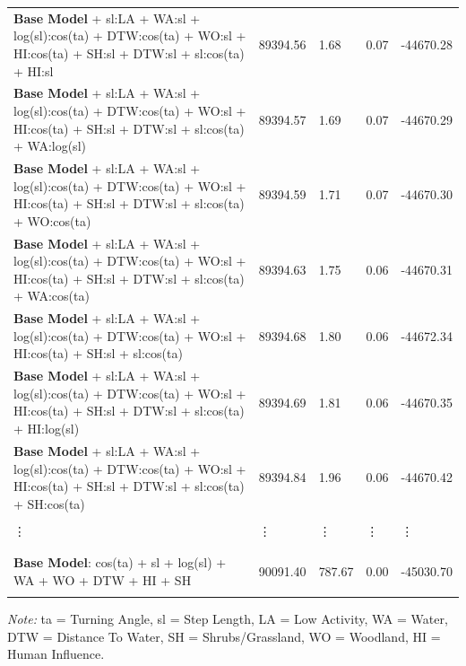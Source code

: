 \documentclass[abstract=off,10pt,a4paper,bibliography=totocnumbered]{article}
\begin{document}
\begin{landscape}
\begin{table}[hbpt]
\begin{center}
{\begin{threeparttable}
\begin{tabular}{lllll}
          \textbf{Base Model} + sl:LA + WA:sl + log(sl):cos(ta) + DTW:cos(ta) + WO:sl + HI:cos(ta) + SH:sl + DTW:sl + sl:cos(ta) + HI:sl & 89394.56 & 1.68 & 0.07 & -44670.28 \\
          \textbf{Base Model} + sl:LA + WA:sl + log(sl):cos(ta) + DTW:cos(ta) + WO:sl + HI:cos(ta) + SH:sl + DTW:sl + sl:cos(ta) + WA:log(sl) & 89394.57 & 1.69 & 0.07 & -44670.29 \\
          \textbf{Base Model} + sl:LA + WA:sl + log(sl):cos(ta) + DTW:cos(ta) + WO:sl + HI:cos(ta) + SH:sl + DTW:sl + sl:cos(ta) + WO:cos(ta) & 89394.59 & 1.71 & 0.07 & -44670.30 \\
          \textbf{Base Model} + sl:LA + WA:sl + log(sl):cos(ta) + DTW:cos(ta) + WO:sl + HI:cos(ta) + SH:sl + DTW:sl + sl:cos(ta) + WA:cos(ta) & 89394.63 & 1.75 & 0.06 & -44670.31 \\
          \textbf{Base Model} + sl:LA + WA:sl + log(sl):cos(ta) + DTW:cos(ta) + WO:sl + HI:cos(ta) + SH:sl + sl:cos(ta) & 89394.68 & 1.80 & 0.06 & -44672.34 \\
          \textbf{Base Model} + sl:LA + WA:sl + log(sl):cos(ta) + DTW:cos(ta) + WO:sl + HI:cos(ta) + SH:sl + DTW:sl + sl:cos(ta) + HI:log(sl) & 89394.69 & 1.81 & 0.06 & -44670.35 \\
          \textbf{Base Model} + sl:LA + WA:sl + log(sl):cos(ta) + DTW:cos(ta) + WO:sl + HI:cos(ta) + SH:sl + DTW:sl + sl:cos(ta) + SH:cos(ta) & 89394.84 & 1.96 & 0.06 & -44670.42 \\
          \hdashline
          \\
          \vdots & \vdots & \vdots & \vdots & \vdots \\
          \\
          \hdashline
          \\
          \textbf{Base Model}: cos(ta) + sl + log(sl) + WA + WO + DTW + HI + SH & 90091.40 & 787.67 & 0.00 & -45030.70\\
          \\
         \bottomrule
       \end{tabular}
       \begin{tablenotes}
         \item \textit{Note:} ta = Turning Angle, sl = Step Length, LA = Low Activity, WA = Water,
         DTW = Distance To Water, SH = Shrubs/Grassland, WO = Woodland, HI =
         Human Influence.
       \end{tablenotes}
     \end{threeparttable}
    }
  \end{center}
\end{table}
\vfill
\raisebox{-1cm}{\makebox[\linewidth]{\thepage}}
\end{landscape}
\end{document}
